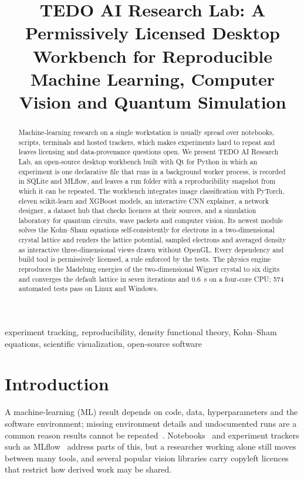 \documentclass[conference]{IEEEtran}
\begin{document}
\title{TEDO AI Research Lab: A Permissively Licensed Desktop Workbench for Reproducible Machine Learning, Computer Vision and Quantum Simulation}

\author{
}

\maketitle

\begin{abstract}
Machine-learning research on a single workstation is usually spread over notebooks, scripts,
terminals and hosted trackers, which makes experiments hard to repeat and leaves licensing and
data-provenance questions open. We present TEDO AI Research Lab, an open-source desktop
workbench built with Qt for Python in which an experiment is one declarative file that runs in a
background worker process, is recorded in SQLite and MLflow, and leaves a run folder with a
reproducibility snapshot from which it can be repeated. The workbench integrates image
classification with PyTorch, eleven scikit-learn and XGBoost models, an interactive CNN
explainer, a network designer, a dataset hub that checks licences at their sources, and a
simulation laboratory for quantum circuits, wave packets and computer vision. Its newest module
solves the Kohn--Sham equations self-consistently for electrons in a two-dimensional crystal
lattice and renders the lattice potential, sampled electrons and averaged density as interactive
three-dimensional views drawn without OpenGL. Every dependency and build tool is permissively
licensed, a rule enforced by the tests. The physics engine reproduces the Madelung energies of the
two-dimensional Wigner crystal to six digits and converges the default lattice in seven iterations
and 0.6~s on a four-core CPU; 574 automated tests pass on Linux and Windows.
\end{abstract}

\begin{IEEEkeywords}
experiment tracking, reproducibility, density functional theory, Kohn--Sham equations,
scientific visualization, open-source software
\end{IEEEkeywords}

\section{Introduction}
A machine-learning (ML) result depends on code, data, hyperparameters and the software
environment; missing environment details and undocumented runs are a common reason results cannot
be repeated~\cite{pineau2021reproducibility}. Notebooks~\cite{kluyver2016jupyter} and experiment
trackers such as MLflow~\cite{zaharia2018mlflow} address parts of this, but a researcher working
alone still moves between many tools, and several popular vision libraries carry copyleft
licences that restrict how derived work may be shared.
\end{document}
